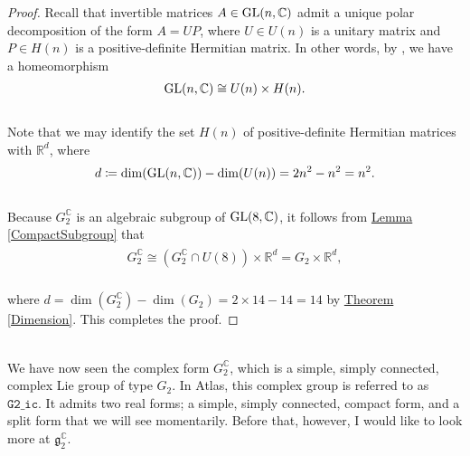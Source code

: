 \noindent\begin{proof} Recall that invertible matrices $A \in \textup{GL}(n, \mathbb{C})$ admit a unique polar decomposition of the form $A = UP$, where $U \in U(n)$ is a unitary matrix and $P \in H(n)$ is a positive-definite Hermitian matrix. In other words, by \cite[Proposition I.V.3]{Che46}, we have a homeomorphism
\begin{align*}
\begin{split}
\textup{GL}(n, \mathbb{C}) \cong U(n) \times H(n).
\end{split}
\end{align*}
\noindent\\[-1.25\linespacing] Note that we may identify the set $H(n)$ of positive-definite Hermitian matrices with $\mathbb{R}^d$, where
\begin{align*}
\begin{split}
d \coloneqq \dim(\textup{GL}(n, \mathbb{C})) - \dim(U(n)) = 2n^2 - n^2 = n^2.
\end{split}
\end{align*}
\noindent\\[-1.25\linespacing] Because $G_2^\mathbb{C}$ is an algebraic subgroup of $\textup{GL}(8, \mathbb{C})$, it follows from \hyperref[CompactSubgroup]{Lemma \ref*{CompactSubgroup}} that
\begin{align*}
\begin{split}
G_2^\mathbb{C} \cong (G_2^\mathbb{C} \cap U(8)) \times \mathbb{R}^d = G_2 \times \mathbb{R}^d,
\end{split}
\end{align*}
\noindent\\[-1.25\linespacing] where $d = \dim(G_2^\mathbb{C}) - \dim(G_2) = 2\times 14 - 14 = 14$ by \hyperref[Dimension]{Theorem \ref*{Dimension}}. This completes the proof.
\end{proof}\\

\noindent We have now seen the complex form $G_2^\mathbb{C}$, which is a simple, simply connected, complex Lie group of type $G_2$. In Atlas, this complex group is referred to as $\texttt{G2\_ic}$. It admits two real forms; a simple, simply connected, compact form, and a split form that we will see momentarily. Before that, however, I would like to look more at $\mathfrak{g}_2^\mathbb{C}$.\\[\linespacing]

